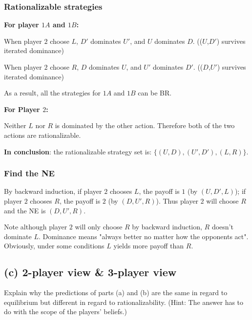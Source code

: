\documentclass{article}
\begin{document}
\subsubsection*{Rationalizable strategies}
\vspace{2mm}

\textbf{For player $1A$ and $1B$:}

When player $2$ choose $L$,  $D'$ dominates $U'$, and $U$ dominates $D$. (($U$,$D'$) survives iterated dominance)

When player $2$ choose $R$, $D$ dominates $U$, and  $U'$ dominates $D'$. (($D$,$U'$) survives iterated dominance)

As a result, all the strategies for $1A$ and $1B$ can be BR.

\medskip

\textbf{For Player $2$:} 

Neither $L$ nor $R$ is dominated by the other action. Therefore both of the two 
actions are rationalizable.

\medskip

\textbf{In conclusion}: the rationalizable strategy set is: $\{(U,D),(U',D'),(L,R)\}$.

\subsubsection*{Find the NE}
By backward induction, if player $2$ chooses $L$, the payoff is $1$ (by $(U,D',L)$); if player $2$ chooses $R$, the payoff is $2$ (by $(D,U',R)$). Thus player $2$ will choose $R$ and the NE is $(D,U',R)$.

\begin{mdframed}[backgroundcolor=blue!20,linecolor=white]
Note although player $2$ will only choose $R$ by backward induction, $R$ doesn't dominate $L$. Dominance means "always better no matter how the opponents act". Obviously, under some conditions $L$ yields more payoff than $R$.
\end{mdframed}



\subsection*{(c) 2-player view \& 3-player view}
Explain why the predictions of parts (a) and (b) are the same in regard
to equilibrium but different in regard to rationalizability. (Hint: The
answer has to do with the scope of the players' beliefs.)
\end{document}
